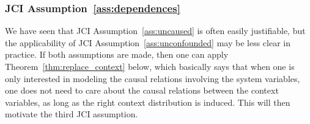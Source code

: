\documentclass[twoside,11pt]{article}
\begin{document}
\subsubsection{JCI Assumption~\ref{ass:dependences}}

We have seen that JCI Assumption~\ref{ass:uncaused} is often easily
justifiable, but the applicability of JCI Assumption~\ref{ass:unconfounded} may
be less clear in practice. If both assumptions are made, then one can
apply Theorem~\ref{thm:replace_context} below, which basically says that when one is only interested
in modeling the causal relations involving the system variables, one does not
need to care about the causal relations between the context variables, as long
as the right context distribution is induced. This will then motivate the third
JCI assumption.
\end{document}
